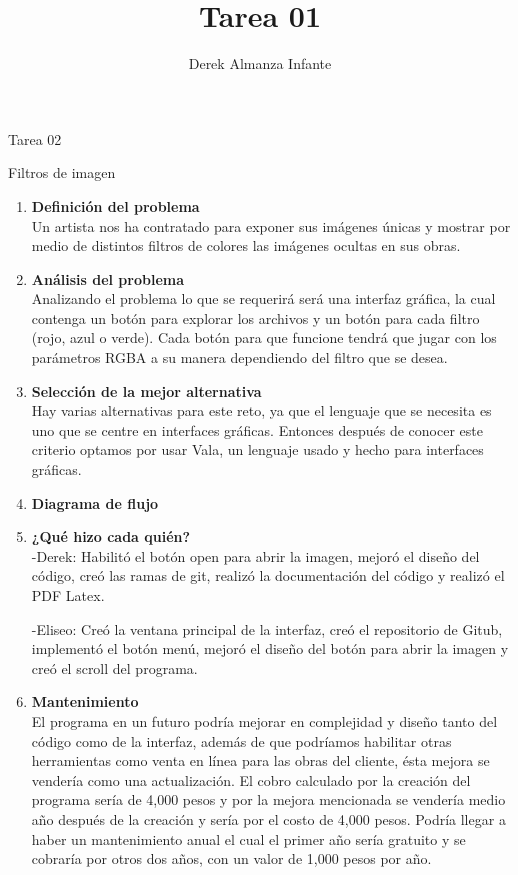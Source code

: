 \documentclass[12pt,letterpaper]{article}
\title{Tarea 01}
\author{Derek Almanza Infante}
\begin{document}
        
    \begin{center}

    {\LARGE Tarea 02 \par}
    {\Large Filtros de imagen \par}

    \end{center}

    \begin{enumerate}
        \item \textbf{Definición del problema}\\
            Un artista nos ha contratado para exponer sus imágenes únicas y mostrar por medio de distintos filtros
            de colores las imágenes ocultas en sus obras.
        \item \textbf{Análisis del problema}\\
            Analizando el problema lo que se requerirá será una interfaz gráfica, la cual contenga un botón para 
            explorar los archivos y un botón para cada filtro (rojo, azul o verde). Cada botón para que 
            funcione tendrá que jugar con los parámetros RGBA a su manera dependiendo del filtro que se desea.
        \item \textbf{Selección de la mejor alternativa}\\
            Hay varias alternativas para este reto, ya que el lenguaje que se necesita es uno que se centre en 
            interfaces gráficas. Entonces después de conocer este criterio optamos por usar Vala, un lenguaje usado
            y hecho para interfaces gráficas.
        \item \textbf{Diagrama de flujo}\\
        \item \textbf{¿Qué hizo cada quién?}\\
            -Derek: Habilitó el botón open para abrir la imagen, mejoró el diseño del código, creó las ramas de git, 
                realizó la documentación del código y realizó el PDF Latex.
            
            -Eliseo: Creó la ventana principal de la interfaz, creó el repositorio de Gitub, implementó el botón menú,
                mejoró el diseño del botón para abrir la imagen y creó el scroll del programa.
        \item \textbf{Mantenimiento}\\
            El programa en un futuro podría mejorar en complejidad y diseño tanto del código como de la interfaz, 
            además de que podríamos habilitar otras herramientas como venta en línea para las obras del cliente, ésta mejora se
            vendería como una actualización. El cobro calculado por la creación del programa sería de 4,000 pesos y por la
            mejora mencionada se vendería medio año después de la creación y sería por el costo de 4,000 pesos. Podría llegar a
            haber un mantenimiento anual el cual el primer año sería gratuito y se cobraría por otros dos años, con un valor de 
            1,000 pesos por año.
    \end{enumerate}
\end{document}
